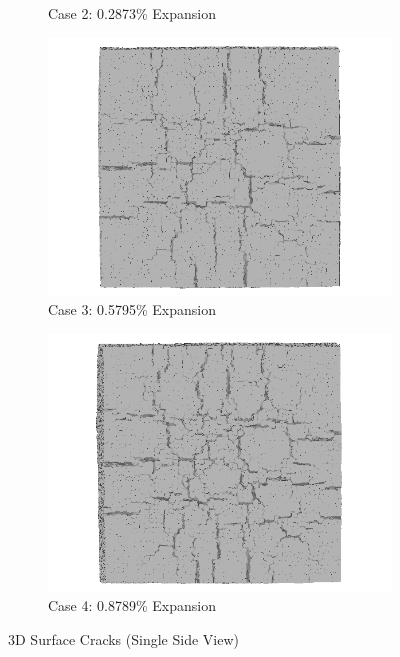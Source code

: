\begin{figure}[!h]
\begin{subfigure}{.5\textwidth}
    \caption{Case 2: 0.2873\% Expansion}
    \end{subfigure}%
    \begin{subfigure}{.5\textwidth}
      \centering
      \includegraphics[width=.8\linewidth]{Files/exp_3D/DEF/A30X0C_3_3ds.png}
    \caption{Case 3: 0.5795\% Expansion}
    \end{subfigure}
    \begin{subfigure}{.5\textwidth}
      \centering
      \includegraphics[width=.8\linewidth]{Files/exp_3D/DEF/A30X0C_4_3ds.png}
    \caption{Case 4: 0.8789\% Expansion}
    \end{subfigure}%

  \caption{3D Surface Cracks (Single Side View)}
  \label{fig:DEF_A30X0C_3DS}
\end{figure}

